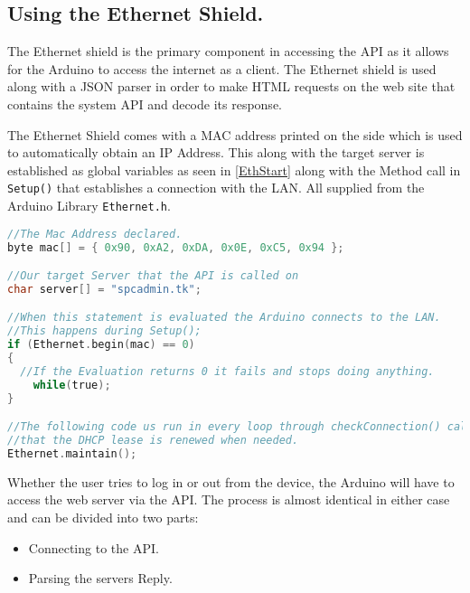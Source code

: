 \subsection{Using the Ethernet Shield.}
\label{sec:ethernetshield}
The Ethernet shield is the primary component in accessing the API as it allows for the Arduino to access the internet as a client.
The Ethernet shield is used along with a JSON parser in order to make HTML requests on the web site that contains the system API and decode its response.

The Ethernet Shield comes with a MAC address printed on the side which is used to automatically obtain an IP Address.
This along with the target server is established as global variables as seen in \autoref{EthStart} along with the Method call in \verb|Setup()| that establishes a connection with the LAN. All supplied from the Arduino Library \verb|Ethernet.h|.
\begin{lstlisting}[frame=single,language=C, label=EthStart, caption=The Method Calls used to establish and maintain a connection.]
//The Mac Address declared.
byte mac[] = { 0x90, 0xA2, 0xDA, 0x0E, 0xC5, 0x94 };

//Our target Server that the API is called on
char server[] = "spcadmin.tk";

//When this statement is evaluated the Arduino connects to the LAN.
//This happens during Setup();
if (Ethernet.begin(mac) == 0) 
{
  //If the Evaluation returns 0 it fails and stops doing anything.
	while(true); 
}

//The following code us run in every loop through checkConnection() call to assure
//that the DHCP lease is renewed when needed.
Ethernet.maintain();
\end{lstlisting}
\newpage
Whether the user tries to log in or out from the device, the Arduino will have to access the web server via the API.
The process is almost identical in either case and can be divided into two parts:
\begin{itemize}
	\item Connecting to the API.
	\item Parsing the servers Reply.
\end{itemize}

